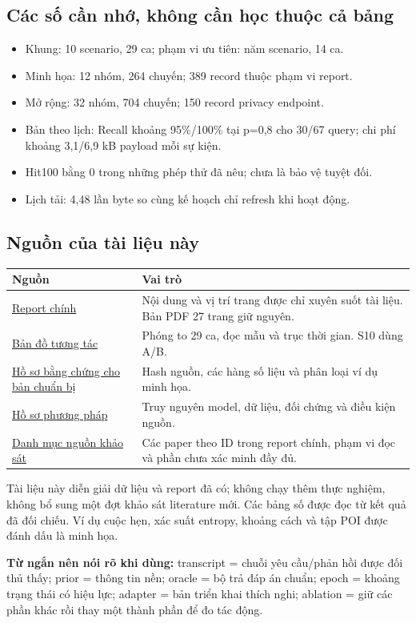 \documentclass[10pt,a4paper]{article}
\begin{document}
\subsection*{Các số cần nhớ, không cần học thuộc cả bảng}
\begin{itemize}
\item Khung: 10 scenario, 29 ca; phạm vi ưu tiên: năm scenario, 14 ca.
\item Minh họa: 12 nhóm, 264 chuyến; 389 record thuộc phạm vi report.
\item Mở rộng: 32 nhóm, 704 chuyến; 150 record privacy endpoint.
\item Bản theo lịch: Recall khoảng 95\%/100\% tại p=0,8 cho 30/67 query; chi phí khoảng 3,1/6,9 kB payload mỗi sự kiện.
\item Hit100 bằng 0 trong những phép thử đã nêu; chưa là bảo vệ tuyệt đối.
\item Lịch tải: 4,48 lần byte so cùng kế hoạch chỉ refresh khi hoạt động.
\end{itemize}

\subsection*{Nguồn của tài liệu này}
\begin{longtable}{@{}P{5.0cm}P{11.2cm}@{}}
\toprule Nguồn & Vai trò\\\midrule
\href{report_explained.pdf}{Report chính} & Nội dung và vị trí trang được chỉ xuyên suốt tài liệu. Bản PDF 27 trang giữ nguyên.\\[4pt]
\href{sample_maps.html}{Bản đồ tương tác} & Phóng to 29 ca, đọc mẫu và trục thời gian. S10 dùng A/B.\\[4pt]
\href{preparation_evidence.json}{Hồ sơ bằng chứng cho bản chuẩn bị} & Hash nguồn, các hàng số liệu và phân loại ví dụ minh họa.\\[4pt]
\href{method_evidence.json}{Hồ sơ phương pháp} & Truy nguyên model, dữ liệu, đối chứng và điều kiện nguồn.\\[4pt]
\href{sources.json}{Danh mục nguồn khảo sát} & Các paper theo ID trong report chính, phạm vi đọc và phần chưa xác minh đầy đủ.\\
\bottomrule
\end{longtable}
Tài liệu này diễn giải dữ liệu và report đã có; không chạy thêm thực nghiệm, không bổ sung một đợt khảo sát literature mới. Các bảng số được đọc từ kết quả đã đối chiếu. Ví dụ cuộc hẹn, xác suất entropy, khoảng cách và tập POI được đánh dấu là minh họa.

\textbf{Từ ngắn nên nói rõ khi dùng:} transcript = chuỗi yêu cầu/phản hồi được đối thủ thấy; prior = thông tin nền; oracle = bộ trả đáp án chuẩn; epoch = khoảng trạng thái có hiệu lực; adapter = bản triển khai thích nghi; ablation = giữ các phần khác rồi thay một thành phần để đo tác động.
\end{document}
